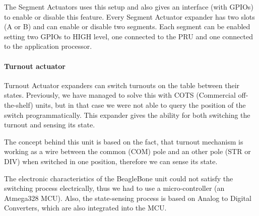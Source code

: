 

The Segment Actuators uses this setup and also gives an interface (with GPIOs) to enable or disable this feature. Every Segment Actuator expander has two slots (A or B) and can enable or disable two segments. Each segment can be enabled setting two GPIOs to HIGH level, one connected to the PRU and one connected to the application processor.

\paragraph{Turnout actuator}
Turnout Actuator expanders can switch turnouts on the table between their states. Previously, we have managed to solve this with COTS (Commercial off-the-shelf) units, but in that case we were not able to query the position of the switch programmatically. This expander gives the ability for both switching the turnout and sensing its state.

The concept behind this unit is based on the fact, that turnout mechanism is working as a wire between the common (COM) pole and an other pole (STR or DIV) when switched in one position, therefore we can sense its state.

The electronic characteristics of the BeagleBone unit could not satisfy the switching process electrically, thus we had to use a micro-controller (an Atmega328 MCU). Also, the state-sensing process is based on Analog to Digital Converters, which are also integrated into the MCU.

